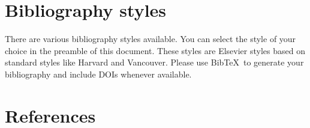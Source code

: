 \documentclass[review]{elsarticle}
\begin{document}
\section{Bibliography styles}

There are various bibliography styles available. You can select the style of your choice in the preamble of this document. These styles are Elsevier styles based on standard styles like Harvard and Vancouver. Please use Bib\TeX\ to generate your bibliography and include DOIs whenever available.


\section*{References}


\end{document}
